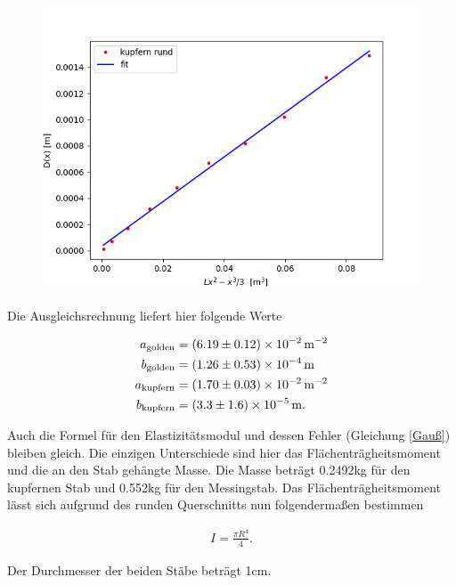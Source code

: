 \begin{figure}
    \centering
    \includegraphics{kre.png}
    \label{fig:kre}
\end{figure}

\noindent Die Ausgleichsrechnung liefert hier folgende Werte

\begin{align*}
    a_\text{golden} &= \SI[separate-uncertainty=true]{6.19(0.12)E-2}{\per \square\metre} \\
    b_\text{golden} &= \SI[separate-uncertainty=true]{1.26(0.53)E-4}{\metre} \\
    a_\text{kupfern} &= \SI[separate-uncertainty=true]{1.70(0.03)E-2}{\per \square\metre}\\
    b_\text{kupfern} &= \SI[separate-uncertainty=true]{3.3(1.6)E-5}{\metre}.
\end{align*}

\noindent Auch die Formel für den Elastizitätsmodul und dessen Fehler (Gleichung \ref{Gauß}) bleiben gleich. Die einzigen Unterschiede sind hier das Flächenträgheitsmoment und die an den Stab gehängte Masse. Die Masse beträgt 0.2492kg für den kupfernen Stab und 0.552kg für den Messingstab. Das Flächenträgheitsmoment lässt sich aufgrund des runden Querschnitts nun folgendermaßen bestimmen

\begin{align*}
    I=\frac{\pi R^4}{4}.
\end{align*}

\noindent Der Durchmesser der beiden Stäbe beträgt 1cm.

